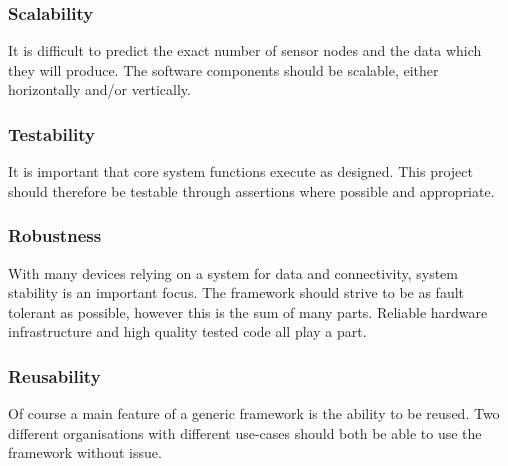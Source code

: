       \subsubsection{Scalability}
        It is difficult to predict the exact number of sensor nodes and the data which they will produce. The software components should be scalable, either horizontally and/or vertically.

      \subsubsection{Testability}
        It is important that core system functions execute as designed. This project should therefore be testable through assertions where possible and appropriate.

      \subsubsection{Robustness}
        With many devices relying on a system for data and connectivity, system stability is an important focus. The framework should strive to be as fault tolerant as possible, however this is the sum of many parts. Reliable hardware infrastructure and high quality tested code all play a part.

      \subsubsection{Reusability}
        Of course a main feature of a generic framework is the ability to be reused. Two different organisations with different use-cases should both be able to use the framework without issue.
